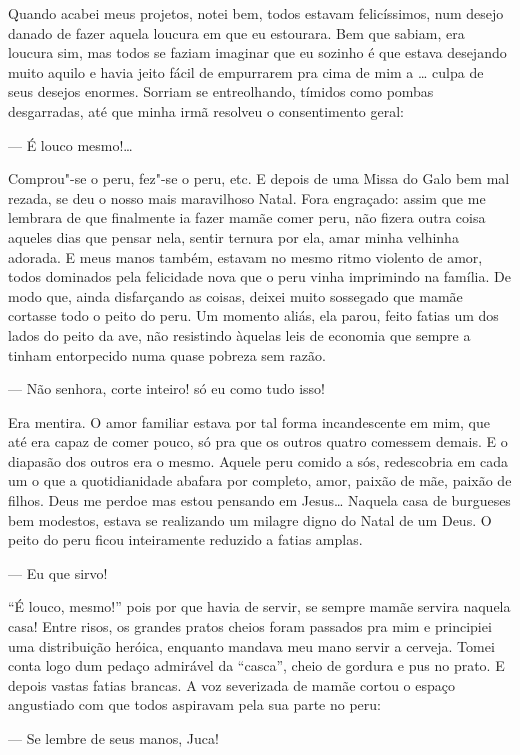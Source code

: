 \begin{linenumbers}
Quando acabei meus projetos, notei bem, todos estavam felicíssimos, num
desejo danado de fazer aquela loucura em que eu estourara. Bem que
sabiam, era loucura sim, mas todos se faziam imaginar que eu sozinho é
que estava desejando muito aquilo e havia jeito fácil de empurrarem pra
cima de mim a \ldots{} culpa de seus desejos enormes. Sorriam se
entreolhando, tímidos como pombas desgarradas, até que minha irmã
resolveu o consentimento geral:

--- É louco mesmo!\ldots{}

Comprou"-se o peru, fez"-se o peru, etc. E depois de uma Missa do Galo bem
mal rezada, se deu o nosso mais maravilhoso Natal. Fora engraçado: assim
que me lembrara de que finalmente ia fazer mamãe comer peru, não fizera
outra coisa aqueles dias que pensar nela, sentir ternura por ela, amar
minha velhinha adorada. E meus manos também, estavam no mesmo ritmo
violento de amor, todos dominados pela felicidade nova que o peru vinha
imprimindo na família. De modo que, ainda disfarçando as coisas, deixei
muito sossegado que mamãe cortasse todo o peito do peru. Um momento
aliás, ela parou, feito fatias um dos lados do peito da ave, não
resistindo àquelas leis de economia que sempre a tinham entorpecido numa
quase pobreza sem razão.

--- Não senhora, corte inteiro! só eu como tudo isso!

Era mentira. O amor familiar estava por tal forma incandescente em mim,
que até era capaz de comer pouco, só pra que os outros quatro comessem
demais. E o diapasão dos outros era o mesmo. Aquele peru comido a sós,
redescobria em cada um o que a quotidianidade abafara por completo,
amor, paixão de mãe, paixão de filhos. Deus me perdoe mas estou pensando
em Jesus\ldots{} Naquela casa de burgueses bem modestos, estava se realizando
um milagre digno do Natal de um Deus. O peito do peru ficou inteiramente
reduzido a fatias amplas.

--- Eu que sirvo!

``É louco, mesmo!'' pois por que havia de servir, se sempre mamãe
servira naquela casa! Entre risos, os grandes pratos cheios foram
passados pra mim e principiei uma distribuição heróica, enquanto mandava
meu mano servir a cerveja. Tomei conta logo dum pedaço admirável da
``casca'', cheio de gordura e pus no prato. E depois vastas fatias
brancas. A voz severizada de mamãe cortou o espaço angustiado com que
todos aspiravam pela sua parte no peru:

--- Se lembre de seus manos, Juca!


\end{linenumbers}
